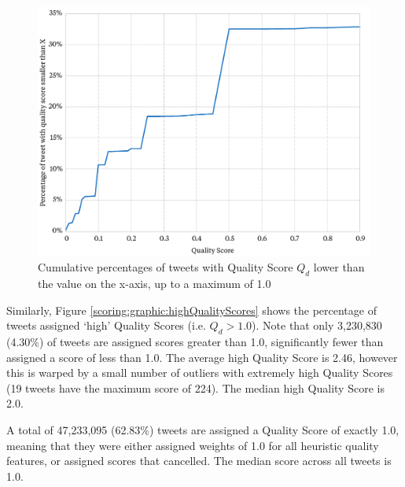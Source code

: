\begin{figure}[h!]
	\centering
	\includegraphics[width=\textwidth]{Chapters/Newsworthiness/data/negativescores.pdf}
	\caption{Cumulative percentages of tweets with Quality Score \(Q_d\) lower than the value on the x-axis, up to a maximum of 1.0}
	\label{scoring:graphic:lowQualityScores}
\end{figure}

Similarly, Figure \ref{scoring:graphic:highQualityScores} shows the percentage of tweets assigned `high' Quality Scores (i.e. \(Q_d > 1.0\)).
Note that only 3,230,830 (4.30\%) of tweets are assigned scores greater than 1.0, significantly fewer than assigned a score of less than 1.0.
The average high Quality Score is 2.46, however this is warped by a small number of outliers with extremely high Quality Scores (19 tweets have the maximum score of 224).
The median high Quality Score is 2.0.

A total of 47,233,095 (62.83\%) tweets are assigned a Quality Score of exactly 1.0, meaning that they were either assigned weights of 1.0 for all heuristic quality features, or assigned scores that cancelled.
The median score across all tweets is 1.0.


